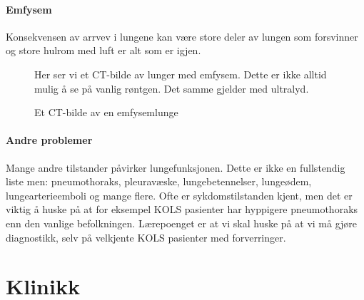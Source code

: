 			\paragraph{Emfysem\\}
				Konsekvensen av arrvev i lungene kan være store deler av lungen som forsvinner og store hulrom med luft er alt som er igjen. 
					\begin{figure}[ht]
                      \centering
                      \caption{Et CT-bilde av en emfysemlunge}
                      {Her ser vi et CT-bilde av lunger med emfysem. Dette er ikke alltid mulig å se på vanlig røntgen. Det samme gjelder med ultralyd.}%
                    \end{figure}
            \paragraph{Andre problemer\\}
            	Mange andre tilstander påvirker lungefunksjonen. Dette er ikke en fullstendig liste men: pneumothoraks, pleuravæske, lungebetennelser, lungeødem, lungearterieemboli og mange flere. Ofte er sykdomstilstanden kjent, men det er viktig å huske på at for eksempel KOLS pasienter har hyppigere pneumothoraks enn den vanlige befolkningen. Lærepoenget er at vi skal huske på at vi må gjøre diagnostikk, selv på velkjente KOLS pasienter med forverringer. 
		\section{Klinikk}
